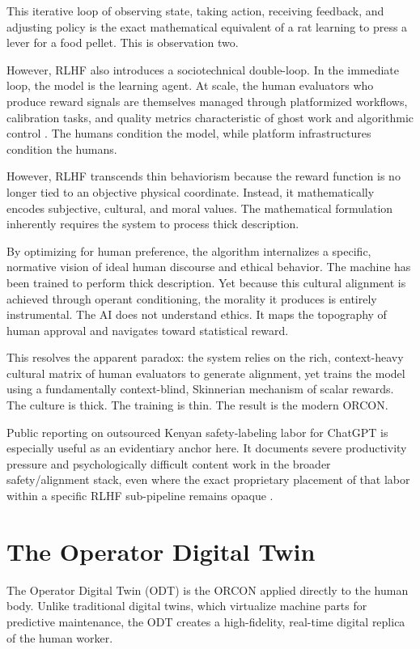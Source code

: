 \documentclass[runningheads]{llncs}
\begin{document}
This iterative loop of observing state, taking action, receiving feedback, and adjusting policy is the exact mathematical equivalent of a rat learning to press a lever for a food pellet. This is observation two.

However, RLHF also introduces a sociotechnical double-loop. In the immediate loop, the model is the learning agent. At scale, the human evaluators who produce reward signals are themselves managed through platformized workflows, calibration tasks, and quality metrics characteristic of ghost work and algorithmic control \cite{gray2019ghost,kellogg2020algorithms}. The humans condition the model, while platform infrastructures condition the humans.

However, RLHF transcends thin behaviorism because the reward function is no longer tied to an objective physical coordinate. Instead, it mathematically encodes subjective, cultural, and moral values. The mathematical formulation inherently requires the system to process thick description.

By optimizing for human preference, the algorithm internalizes a specific, normative vision of ideal human discourse and ethical behavior. The machine has been trained to perform thick description. Yet because this cultural alignment is achieved through operant conditioning, the morality it produces is entirely instrumental. The AI does not understand ethics. It maps the topography of human approval and navigates toward statistical reward. 

This resolves the apparent paradox: the system relies on the rich, context-heavy cultural matrix of human evaluators to generate alignment, yet trains the model using a fundamentally context-blind, Skinnerian mechanism of scalar rewards. The culture is thick. The training is thin. The result is the modern ORCON.

Public reporting on outsourced Kenyan safety-labeling labor for ChatGPT is especially useful as an evidentiary anchor here. It documents severe productivity pressure and psychologically difficult content work in the broader safety/alignment stack, even where the exact proprietary placement of that labor within a specific RLHF sub-pipeline remains opaque \cite{perrigo2023time}.

\section{The Operator Digital Twin}

The Operator Digital Twin (ODT) is the ORCON applied directly to the human body. Unlike traditional digital twins, which virtualize machine parts for predictive maintenance, the ODT creates a high-fidelity, real-time digital replica of the human worker.
\end{document}
